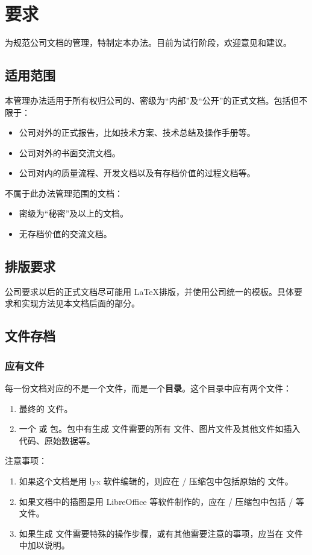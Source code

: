 \chapter{要求}

为规范公司文档的管理，特制定本办法。目前为试行阶段，欢迎意见和建议。
\section{适用范围}
本管理办法适用于所有权归公司的、密级为“内部”及“公开”的正式文档。包括但不限于：
\begin{itemize}
\item 公司对外的正式报告，比如技术方案、技术总结及操作手册等。
\item 公司对外的书面交流文档。
\item 公司对内的质量流程、开发文档以及有存档价值的过程文档等。
\end{itemize}
不属于此办法管理范围的文档：
\begin{itemize}
\item 密级为“秘密”及以上的文档。
\item 无存档价值的交流文档。
\end{itemize}

\section{排版要求}
公司要求以后的正式文档尽可能用 \LaTeX 排版，并使用公司统一的模板。具体要求和实现方法见本文档后面的部分。

\section{文件存档}

\subsection{应有文件}
每一份文档对应的不是一个文件，而是一个{\bf 目录}。这个目录中应有两个文件：
\begin{enumerate}
\item 最终的  文件。
\item 一个  或  包。包中有生成  文件需要的所有  文件、图片文件及其他文件如插入代码、原始数据等。
\end{enumerate}
注意事项：
\begin{enumerate}
\item 如果这个文档是用 lyx 软件编辑的，则应在 / 压缩包中包括原始的  文件。
\item 如果文档中的插图是用 LibreOffice 等软件制作的，应在 / 压缩包中包括 / 等文件。
\item 如果生成  文件需要特殊的操作步骤，或有其他需要注意的事项，应当在  文件中加以说明。
\end{enumerate}

